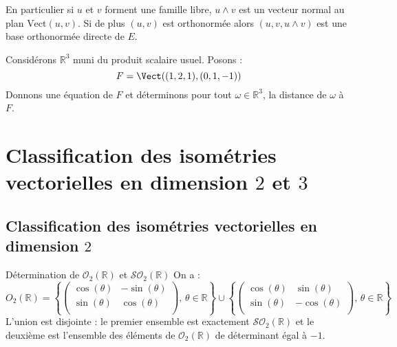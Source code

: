 \documentclass[french,11pt,twoside]{VcCours}
\begin{document}
\begin{Remarque}{} En particulier si $u$ et $v$ forment une famille libre, $u \wedge v$ est un vecteur normal au plan $\textrm{Vect}(u,v)$. Si de plus $(u,v)$ est orthonormée alors $(u,v,u \wedge v)$ est une base orthonormée directe de $E$.
\end{Remarque}

\begin{Exemple}{} Considérons $\mathbb{R}^3$ muni du produit scalaire usuel. Posons :
$$ F = \Vect((1,2,1),(0,1,-1))$$
Donnons une équation de $F$ et déterminons pour tout $\omega \in \mathbb{R}^3$, la distance de $\omega$ à $F$.

\vspace{6cm}
\end{Exemple}

\section{Classification des isométries vectorielles en dimension \texorpdfstring{$2$ et $3$}{2 et 3}}
\subsection{Classification des isométries vectorielles en dimension \texorpdfstring{$2$}{2}}

\begin{Theoreme}{Détermination de $\mathcal{O}_2(\mathbb{R})$ et $\mathcal{SO}_2(\mathbb{R})$}
On a :
$$ O_2(\mathbb{R}) = \left\lbrace \begin{pmatrix}
\cos(\theta) & - \sin(\theta) \\
\sin(\theta) & \cos(\theta) \\
\end{pmatrix}, \, \theta \in \mathbb{R} \right\rbrace \cup \left\lbrace \begin{pmatrix}
\cos(\theta) & \sin(\theta) \\
\sin(\theta) & -\cos(\theta) \\
\end{pmatrix}, \, \theta \in \mathbb{R} \right\rbrace$$
L'union est disjointe : le premier ensemble est exactement $\mathcal{SO}_2(\mathbb{R})$ et le deuxième est l'ensemble des éléments de $\mathcal{O}_2(\mathbb{R})$ de déterminant égal à $-1$.
\end{Theoreme}

\begin{Demonstration}{}
\vspace{10cm}
\end{Demonstration}
\end{document}
